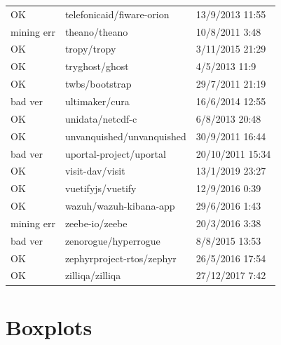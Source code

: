 \begin{appendices}
\begin{center}
\begin{longtable}{|l|l|l|}
            OK & telefonicaid/fiware-orion & 13/9/2013 11:55 \\
            mining err & theano/theano & 10/8/2011 3:48 \\
            OK & tropy/tropy & 3/11/2015 21:29 \\
            OK & tryghost/ghost & 4/5/2013 11:9 \\
            OK & twbs/bootstrap & 29/7/2011 21:19 \\
            bad ver & ultimaker/cura & 16/6/2014 12:55 \\
            OK & unidata/netcdf-c & 6/8/2013 20:48 \\
            OK & unvanquished/unvanquished & 30/9/2011 16:44 \\
            bad ver & uportal-project/uportal & 20/10/2011 15:34 \\
            OK & visit-dav/visit & 13/1/2019 23:27 \\
            OK & vuetifyjs/vuetify & 12/9/2016 0:39 \\
            OK & wazuh/wazuh-kibana-app & 29/6/2016 1:43 \\
            mining err & zeebe-io/zeebe & 20/3/2016 3:38 \\
            bad ver & zenorogue/hyperrogue & 8/8/2015 13:53 \\
            OK & zephyrproject-rtos/zephyr & 26/5/2016 17:54 \\
            OK & zilliqa/zilliqa & 27/12/2017 7:42 \\
            \end{longtable}
    \end{center}
    
    \newpage

    \section{Boxplots}
    \label{app:boxplots}


\end{appendices}
